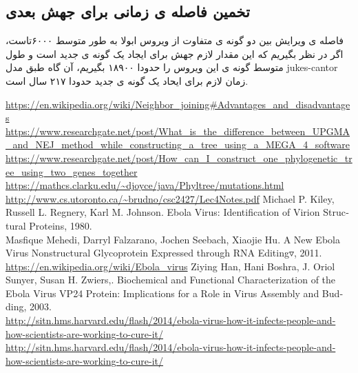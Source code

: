 \documentclass[11pt, oneside]{article}
\begin{document}
\subsection*{تخمین فاصله ی زمانی برای جهش بعدی}
فاصله ی ویرایش بین دو گونه ی متفاوت از ویروس ابولا به طور متوسط ۶۰۰۰تاست، اگر در نظر بگیریم که این مقدار لازم جهش برای ایجاد یک گونه ی جدید است و طول متوسط گونه ی این ویروس را حدودا ۱۸۹۰۰ بگیریم، آن گاه طبق مدل jukes-cantor زمان لازم برای ایحاد یک گونه ی جدید حدودا ۲۱۷ سال است.
\begin{thebibliography}{1}
\begin{latin}

   {\url{https://en.wikipedia.org/wiki/Neighbor_joining#Advantages_and_disadvantages}}
   {\url{https://www.researchgate.net/post/What_is_the_difference_between_UPGMA_and_NEJ_method_while_constructing_a_tree_using_a_MEGA_4_software}}
   {\url{https://www.researchgate.net/post/How_can_I_construct_one_phylogenetic_tree_using_two_genes_together}}  
   {\url{https://mathcs.clarku.edu/~djoyce/java/Phyltree/mutations.html}}  
   {\url{http://www.cs.utoronto.ca/~brudno/csc2427/Lec4Notes.pdf}}  
Michael P. Kiley,  Russell L. Regnery, Karl M. Johnson. Ebola Virus: Identification of Virion Structural Proteins, 1980.\\
Masfique Mehedi, Darryl Falzarano, Jochen Seebach, Xiaojie Hu. A New Ebola Virus Nonstructural Glycoprotein Expressed through RNA Editing▿, 2011.\\
   {\url{https://en.wikipedia.org/wiki/Ebola_virus}}  
Ziying Han, Hani Boshra, J. Oriol Sunyer, Susan H. Zwiers,. Biochemical and Functional Characterization of the Ebola Virus VP24 Protein: Implications for a Role in Virus Assembly and Budding, 2003.\\
   {\url{http://sitn.hms.harvard.edu/flash/2014/ebola-virus-how-it-infects-people-and-how-scientists-are-working-to-cure-it/}}  
   {\url{http://sitn.hms.harvard.edu/flash/2014/ebola-virus-how-it-infects-people-and-how-scientists-are-working-to-cure-it/}}

\end{latin}
\end{thebibliography}
\end{document}
